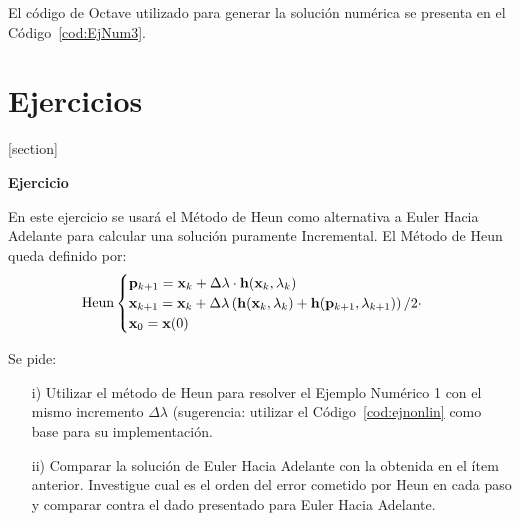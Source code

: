 El código de Octave utilizado para generar la solución numérica se presenta en el Código~\ref{cod:EjNum3}.











\section{Ejercicios}

[section]
\newenvironment{exercise}[1][]{\addtocounter{numEjer}{1} \noindent \textbf{Ejercicio \arabic{numEjer} #1}}{}





\bigskip
\begin{exercise}
	
	En este ejercicio se usará el Método de Heun como alternativa a Euler Hacia Adelante para calcular una solución puramente Incremental.  El Método de Heun queda definido por:
	\begin{equation*}
		\text{Heun}
		\begin{cases} 
			{\bf p}_{k+1} = {\bf x}_k + \Delta \lambda \cdot {\bf h}({\bf x}_k,\lambda_k) \\
			{\bf x}_{k+1}= {\bf x}_k + \Delta \lambda \left({\bf h}({\bf x}_k,\lambda_k) + {\bf h}({\bf p}_{k+1},\lambda_{k+1}) \right)/2\cdot  \\
			{\bf x}_0={\bf x}(0)
		\end{cases}
	\end{equation*}
	
	Se pide:
	\begin{itemize}
		\item[i)] Utilizar el método de Heun para resolver el Ejemplo Numérico 1 con el mismo incremento $\Delta \lambda$ (sugerencia: utilizar el Código~\ref{cod:ejnonlin} como base para su implementación.
		\item[ii)] Comparar la solución de Euler Hacia Adelante con la obtenida en el ítem anterior. Investigue cual es el orden del error cometido por Heun en cada paso y comparar contra el dado presentado para Euler Hacia Adelante.
	\end{itemize}
\end{exercise}


